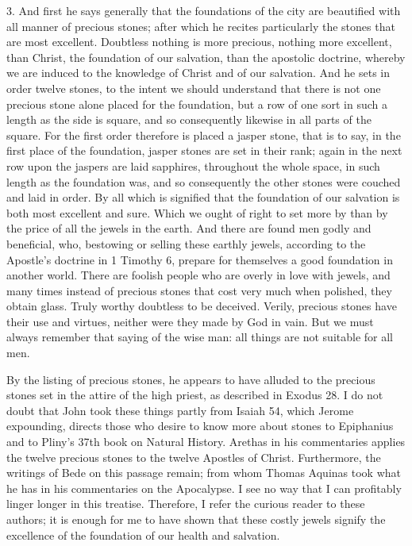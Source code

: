 3. And first he says generally that the foundations of the city are beautified with all manner of precious stones; after which he recites particularly the stones that are most excellent. Doubtless nothing is more precious, nothing more excellent, than Christ, the foundation of our salvation, than the apostolic doctrine, whereby we are induced to the knowledge of Christ and of our salvation. And he sets in order twelve stones, to the intent we should understand that there is not one precious stone alone placed for the foundation, but a row of one sort in such a length as the side is square, and so consequently likewise in all parts of the square. For the first order therefore is placed a jasper stone, that is to say, in the first place of the foundation, jasper stones are set in their rank; again in the next row upon the jaspers are laid sapphires, throughout the whole space, in such length as the foundation was, and so consequently the other stones were couched and laid in order. By all which is signified that the foundation of our salvation is both most excellent and sure. Which we ought of right to set more by than by the price of all the jewels in the earth. And there are found men godly and beneficial, who, bestowing or selling these earthly jewels, according to the Apostle’s doctrine in 1 Timothy 6, prepare for themselves a good foundation in another world. There are foolish people who are overly in love with jewels, and many times instead of precious stones that cost very much when polished, they obtain glass. Truly worthy doubtless to be deceived. Verily, precious stones have their use and virtues, neither were they made by God in vain. But we must always remember that saying of the wise man: all things are not suitable for all men.

By the listing of precious stones, he appears to have alluded to the precious stones set in the attire of the high priest, as described in Exodus 28. I do not doubt that John took these things partly from Isaiah 54, which Jerome expounding, directs those who desire to know more about stones to Epiphanius and to Pliny’s 37th book on Natural History. Arethas in his commentaries applies the twelve precious stones to the twelve Apostles of Christ. Furthermore, the writings of Bede on this passage remain; from whom Thomas Aquinas took what he has in his commentaries on the Apocalypse. I see no way that I can profitably linger longer in this treatise. Therefore, I refer the curious reader to these authors; it is enough for me to have shown that these costly jewels signify the excellence of the foundation of our health and salvation.

